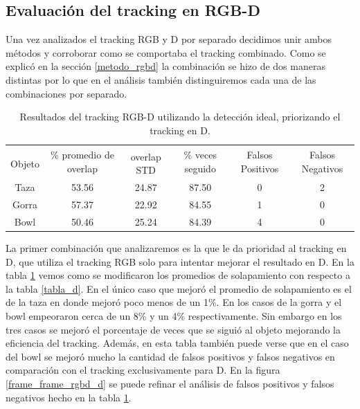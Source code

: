\subsection{Evaluación del tracking en RGB-D}
Una vez analizados el tracking RGB y D por separado decidimos unir ambos métodos y corroborar como se comportaba el tracking combinado. Como se explicó en la sección \ref{metodo_rgbd} la combinación se hizo de dos maneras distintas por lo que en el análisis también distinguiremos cada una de las combinaciones por separado.

\begin{table}
    \begin{tabular}{|c|c|c|c|c|c|}
    \hline
    & \multirow{2}{2.4cm}{\% promedio de overlap} & & \multirow{2}{2cm}{\% veces seguido} & \multirow{2}{1.6cm}{Falsos Positivos} & \multirow{2}{1.6cm}{Falsos Negativos}\\
	Objeto & & overlap STD & & &\\
    \hline
    Taza   & 53.56      & 24.87       & 87.50             & 0                & 2\\
    \hline
    Gorra  & 57.37      & 22.92       & 84.55             & 1                & 0\\
    \hline
    Bowl   & 50.46      & 25.24       & 84.39             & 4                & 0\\
    \hline
    \end{tabular}
\caption{Resultados del tracking RGB-D utilizando la detección ideal, priorizando el tracking en D.}
\label{tabla_rgbd_d}
\end{table}

La primer combinación que analizaremos es la que le da prioridad al tracking en D, que utiliza el tracking RGB solo para intentar mejorar el resultado en D. En la tabla \ref{tabla_rgbd_d} vemos como se modificaron los promedios de solapamiento con respecto a la tabla \ref{tabla_d}. En el único caso que mejoró el promedio de solapamiento es el de la taza en donde mejoró poco menos de un 1\%. En los casos de la gorra y el bowl empeoraron cerca de un 8\% y un 4\% respectivamente. Sin embargo en los tres casos se mejoró el porcentaje de veces que se siguió al objeto mejorando la eficiencia del tracking. Además, en esta tabla también puede verse que en el caso del bowl se mejoró mucho la cantidad de falsos positivos y falsos negativos en comparación con el tracking exclusivamente para D. En la figura \ref{frame_frame_rgbd_d} se puede refinar el análisis de falsos positivos y falsos negativos hecho en la tabla \ref{tabla_rgbd_d}.

